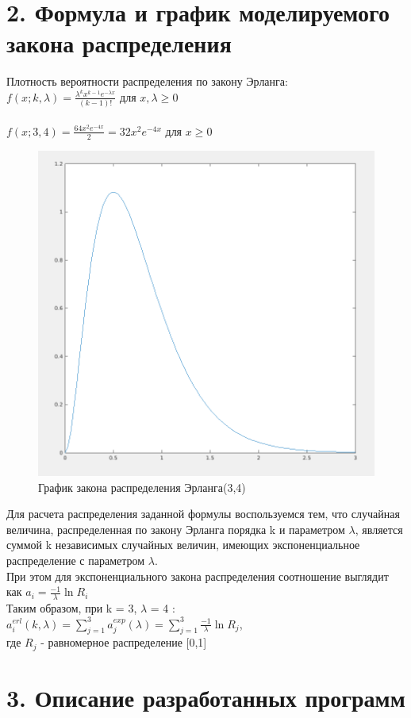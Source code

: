 \documentclass[12pt]{article}
\begin{document}
\newpage
 \section*{2. Формула и график моделируемого закона распределения}%
Плотность вероятности распределения по закону Эрланга:\\
$f(x; k, \lambda) = \frac{\lambda^kx^{k - 1}e^{-\lambda x}}{(k-1)!} $ для $ x,\lambda \geq 0$\\ \\
$f(x; 3, 4) = \frac{64x^{2}e^{-4 x}}{2} = 32x^2e^{-4 x} $ для $ x \geq 0$

 \begin{figure}[!h]
	\centering
	\includegraphics[width=0.5\linewidth]{var8_erlang.png}
	\caption{График закона распределения Эрланга(3,4)}
\end{figure}
 
Для расчета распределения заданной формулы воспользуемся тем, что случайная величина, распределенная по закону Эрланга порядка k и параметром $\lambda$, является суммой k независимых случайных величин, имеющих экспоненциальное распределение с параметром $\lambda$.\\

При этом для экспоненциального закона распределения соотношение выглядит как $a_i = \frac{-1}{\lambda}\ln{R_i}$\\

Таким образом, при k = 3, $\lambda$ = 4 :\\

$a_i^{erl}(k,\lambda) = \sum_{j=1}^3a_j^{exp}(\lambda) = \sum_{j=1}^3\frac{-1}{\lambda}\ln{R_j}$,\\
 \tab \tab \quad \footnotesize{где $R_j$ - равномерное распределение [0,1]}
 
\newpage
 \section*{3. Описание разработанных программ}
 
\end{document}
